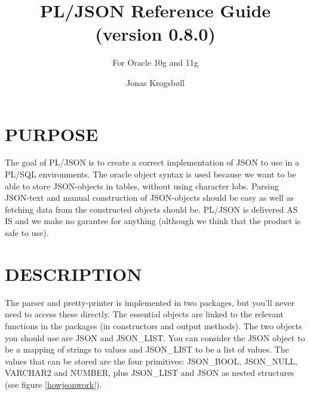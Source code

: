 \documentclass[11pt,twocolumn, a4paper]{article}
\title{PL/JSON Reference Guide (version 0.8.0)}
\subtitle{For Oracle 10g and 11g}
\author{Jonas Krogsbøll}
\date{}
\begin{document}
\maketitle

\section*{PURPOSE}
The goal of PL/JSON is to create a correct implementation of JSON to use in a PL/SQL environments. The oracle object syntax is used because we want to be able to store JSON-objects in tables, without using character lobs. Parsing JSON-text and manual construction of JSON-objects should be easy as well as fetching data from the constructed objects should be. PL/JSON is delivered AS IS and we make no garantee for anything (although we think that the product is safe to use).

\section*{DESCRIPTION}
The parser and pretty-printer is implemented in two packages, but you'll never need to access these directly. The essential objects are linked to the relevant functions in the packages (in constructors and output methods). The two objects you should use are JSON and JSON\_LIST. You can consider the JSON object to be a mapping of strings to values and JSON\_LIST to be a list of values. The values that can be stored are the four primitives: JSON\_BOOL, JSON\_NULL, VARCHAR2 and NUMBER, plus JSON\_LIST and JSON as nested structures (see figure \ref{howjsonwork}).
\end{document}
